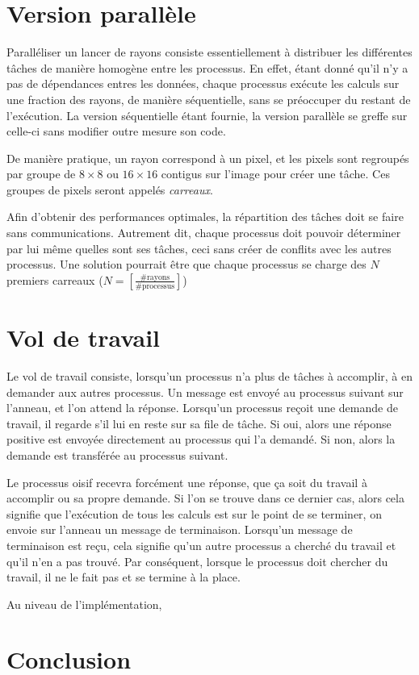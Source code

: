 \documentclass[a4paper,11pt]{article}
\begin{document}
\section{Version parallèle}

Paralléliser un lancer de rayons consiste essentiellement à distribuer les différentes tâches de manière homogène entre les processus. En effet, étant donné qu'il n'y  a pas de dépendances entres les données, chaque processus exécute les calculs sur une fraction des rayons, de manière séquentielle, sans se préoccuper du restant de l'exécution. La version séquentielle étant fournie, la version parallèle se greffe sur celle-ci sans modifier outre mesure son code.

De manière pratique, un rayon correspond à un pixel, et les pixels sont regroupés par groupe de $8 \times 8$ ou $16 \times 16$ contigus sur l'image pour créer une tâche. Ces groupes de pixels seront appelés \emph{carreaux}. 

Afin d'obtenir des performances optimales, la répartition des tâches doit se faire sans communications. Autrement dit, chaque processus doit pouvoir déterminer par lui même quelles sont ses tâches, ceci sans créer de conflits avec les autres processus. Une solution pourrait être que chaque processus se charge des $N$ premiers carreaux ($N = \left[\frac{\#\mathrm{rayons}}{\#\mathrm{processus}}\right]$)


\section{Vol de travail}

Le vol de travail consiste, lorsqu'un processus n'a plus de tâches à accomplir, à en demander aux autres processus. Un message est envoyé au processus suivant sur l'anneau, et l'on attend la réponse. Lorsqu'un processus reçoit une demande de travail, il regarde s'il lui en reste sur sa file de tâche. Si oui, alors une réponse positive est envoyée directement au processus qui l'a demandé. Si non, alors la demande est transférée au processus suivant.

Le processus oisif recevra forcément une réponse, que ça soit du travail à accomplir ou sa propre demande. Si l'on se trouve dans ce dernier cas, alors cela signifie que l'exécution de tous les calculs est sur le point de se terminer, on envoie sur l'anneau un message de terminaison. Lorsqu'un message de terminaison est reçu, cela signifie qu'un autre processus a cherché du travail et qu'il n'en a pas trouvé. Par conséquent, lorsque le processus doit chercher du travail, il ne le fait pas et se termine à la place.

Au niveau de l'implémentation, 


\section{Conclusion}
\end{document}
